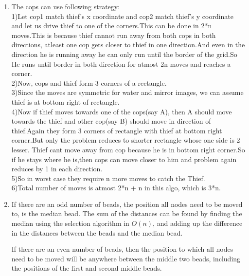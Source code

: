 \documentclass[12pt]{article}
\begin{document}
\begin{enumerate}
    \item %
    The cops can use following strategy:\\
    1)Let cop1 match thief's x coordinate and cop2 match thief's y coordinate and let us drive thief to one of the corners.This can be done in 2*n moves.This is because thief cannot run away from both cops in both directions, atleast one cop gets closer to thief in one direction.And even in the direction he is running away he can only run until the border of the grid.So He runs until border in both direction for atmost 2n moves and reaches a corner.\\
    2)Now, cops and thief form 3 corners of a rectangle.\\
    3)Since the moves are symmetric for water and mirror images, we can assume thief is at bottom right of rectangle.\\
    4)Now if thief moves towards one of the cops(say A), then A should move towards the thief and other cop(say B) should move in direction of thief.Again they form 3 corners of rectangle with thief at bottom right corner.But only the problem reduces to shorter rectangle whose one side is 2 lesser. Thief cant move away from cop because he is in bottom right corner.So if he stays where he is,then cops can move closer to him and problem again reduces by 1 in each direction.\\
    5)So in worst case they require n more moves to catch the Thief.\\
    6)Total number of moves is atmost 2*n + n in this algo, which is 3*n.
    \item
    If there are an odd number of beads, the position all nodes need to be moved to, is the median bead. The sum of the distances can be found by finding the median using the selection algorithm in $O(n)$, and adding up the difference in the distances between the beads and the median bead.
    
    If there are an even number of beads, then the position to which all nodes need to be moved will be anywhere between the middle two beads, including the positions of the first and second middle beads.
    

\end{enumerate}
\end{document}
